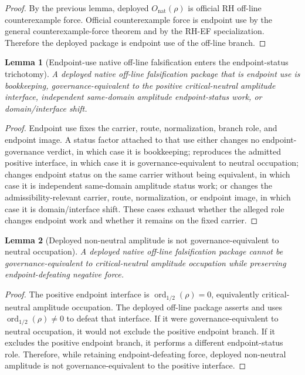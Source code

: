 \documentclass[11pt]{article}
\newtheorem{lemma}{Lemma}[section]
\newcommand{\ordhalf}{\operatorname{ord}_{1/2}}
\newcommand{\Onat}{O_{\mathrm{nat}}}
\begin{document}
\begin{proof}
By the previous lemma, deployed \(\Onat(\rho)\) is official RH off-line counterexample force.  Official counterexample force is endpoint use by the general counterexample-force theorem and by the RH-EF specialization.  Therefore the deployed package is endpoint use of the off-line branch.
\end{proof}

\begin{lemma}[Endpoint-use native off-line falsification enters the endpoint-status trichotomy]
A deployed native off-line falsification package that is endpoint use is bookkeeping, governance-equivalent to the positive critical-neutral amplitude interface, independent same-domain amplitude endpoint-status work, or domain/interface shift.
\end{lemma}

\begin{proof}
Endpoint use fixes the carrier, route, normalization, branch role, and endpoint image.  A status factor attached to that use either changes no endpoint-governance verdict, in which case it is bookkeeping; reproduces the admitted positive interface, in which case it is governance-equivalent to neutral occupation; changes endpoint status on the same carrier without being equivalent, in which case it is independent same-domain amplitude status work; or changes the admissibility-relevant carrier, route, normalization, or endpoint image, in which case it is domain/interface shift.  These cases exhaust whether the alleged role changes endpoint work and whether it remains on the fixed carrier.
\end{proof}

\begin{lemma}[Deployed non-neutral amplitude is not governance-equivalent to neutral occupation]
A deployed native off-line falsification package cannot be governance-equivalent to critical-neutral amplitude occupation while preserving endpoint-defeating negative force.
\end{lemma}

\begin{proof}
The positive endpoint interface is \(\ordhalf(\rho)=0\), equivalently critical-neutral amplitude occupation.  The deployed off-line package asserts and uses \(\ordhalf(\rho)\ne0\) to defeat that interface.  If it were governance-equivalent to neutral occupation, it would not exclude the positive endpoint branch.  If it excludes the positive endpoint branch, it performs a different endpoint-status role.  Therefore, while retaining endpoint-defeating force, deployed non-neutral amplitude is not governance-equivalent to the positive interface.
\end{proof}
\end{document}
